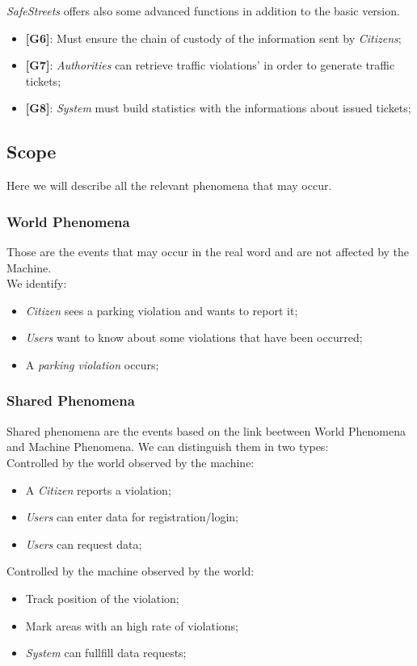 \documentclass{article}
\begin{document}
\textit{SafeStreets} offers also some advanced functions in addition to the basic version.
\begin{itemize}
    \item \textbf{[G6]}: Must ensure the chain of custody of the information sent by \textit{Citizens};
    \item \textbf{[G7]}: \textit{Authorities} can retrieve traffic violations' in order to generate traffic tickets;
    \item \textbf{[G8]}: \textit{System} must build statistics with the informations about issued tickets;
\end{itemize}

\subsection{Scope}
Here we will describe all the relevant phenomena that may occur. 

\subsubsection{World Phenomena}
Those are the events that may occur in the real word and are not affected by the Machine.
\\We identify:
\begin{itemize}
    \item \textit{Citizen} sees a parking violation and wants to report it;
    \item \textit{Users} want to know about some violations that have been occurred;
    \item A \textit{parking violation} occurs; 
\end{itemize} 

\subsubsection{Shared Phenomena}
Shared phenomena are the events based on the link beetween World Phenomena and Machine Phenomena.
We can distinguish them in two types:
\\
Controlled by the world observed by the machine:
\begin{itemize}
    \item A \textit{Citizen} reports a violation;
    \item \textit{Users} can enter data for registration/login;
    \item \textit{Users} can request data;
\end{itemize}
Controlled by the machine observed by the world:
\begin{itemize}
    \item Track position of the violation;
    \item Mark areas with an high rate of violations;
    \item \textit{System} can fullfill data requests;
\end{itemize}
\end{document}
